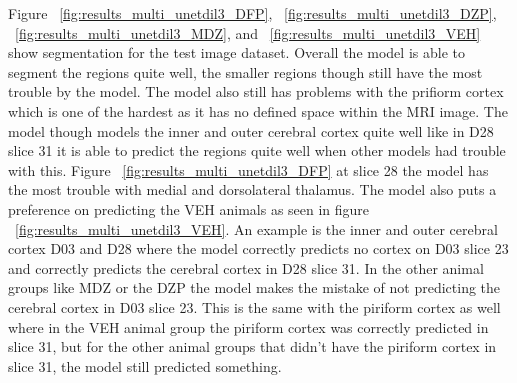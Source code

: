 Figure ~\ref{fig:results_multi_unetdil3_DFP}, ~\ref{fig:results_multi_unetdil3_DZP}, ~\ref{fig:results_multi_unetdil3_MDZ}, and ~\ref{fig:results_multi_unetdil3_VEH} show segmentation for the test image dataset. 
Overall the model is able to segment the regions quite well, the smaller regions though still have the most trouble by the model. 
The model also still has problems with the prifiorm cortex which is one of the hardest as it has no defined space within the MRI image.
The model though models the inner and outer cerebral cortex quite well like in D28 slice 31 it is able to predict the regions quite well when other models had trouble with this.
Figure ~\ref{fig:results_multi_unetdil3_DFP} at slice 28 the model has the most trouble with medial and dorsolateral thalamus.
The model also puts a preference on predicting the VEH animals as seen in figure ~\ref{fig:results_multi_unetdil3_VEH}.
An example is the inner and outer cerebral cortex D03 and D28 where the model correctly predicts no cortex on D03 slice 23 and correctly predicts the cerebral cortex in D28 slice 31. In the other animal groups like MDZ or the DZP the model makes the mistake of not predicting the cerebral cortex in D03 slice 23. 
This is the same with the piriform cortex as well where in the VEH animal group the piriform cortex was correctly predicted in slice 31, but for the other animal groups that didn't have the piriform cortex in slice 31, the model still predicted something.

